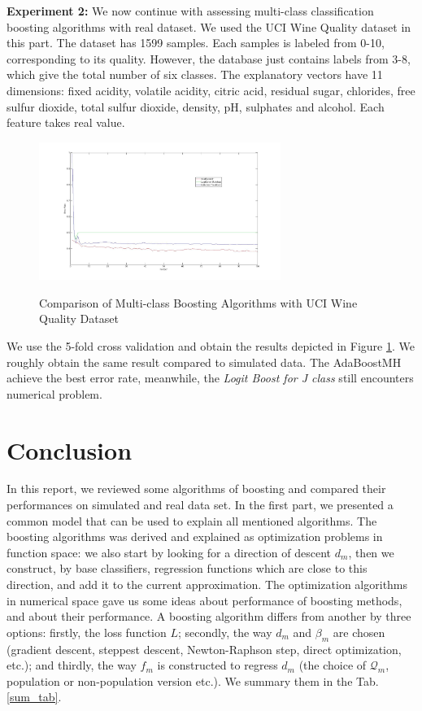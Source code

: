 \documentclass[a4paper,twoside,12pt]{article}
\begin{document}
\textbf{Experiment 2:} We now continue with assessing multi-class classification boosting algorithms with real dataset. We used the UCI Wine Quality dataset in this part. The dataset has 1599 samples. Each samples is labeled from 0-10, corresponding to its quality. However, the database just contains   labels from 3-8, which give the total number of six classes. The explanatory vectors have 11 dimensions: fixed acidity, volatile acidity, citric acid, residual sugar, chlorides, free sulfur dioxide, total sulfur dioxide, density, pH, sulphates and alcohol. Each feature takes real value.
\begin{figure}[H]
\centering
\caption{Comparison of Multi-class Boosting Algorithms with UCI Wine Quality Dataset}
\includegraphics[width = 0.7\textwidth]{Figures/wine_quality}
\label{fig:wine_quality}
\end{figure}
We use the 5-fold cross validation and obtain the results depicted in Figure \ref{fig:wine_quality}. We roughly obtain the same result compared to simulated data. The AdaBoostMH achieve the best error rate, meanwhile, the \textit{Logit Boost for J class} still encounters numerical problem.

\section{Conclusion}
In this report, we reviewed some algorithms of boosting and compared their performances on simulated and real data set. In the first part, we presented a common model that can be used to explain all mentioned algorithms. The boosting algorithms was derived and explained as optimization problems in function space: we also start by looking for a direction of descent $d_m$, then we construct, by base classifiers, regression functions which are close to this direction, and add it to the current approximation. The optimization algorithms in numerical space gave us some ideas about performance of boosting methods, and about their performance. A boosting algorithm differs from another by three options: firstly, the loss function $L$; secondly, the way $d_m$ and $\beta_m$ are chosen (gradient descent, steppest descent, Newton-Raphson step, direct optimization, etc.); and thirdly, the way $f_m$ is constructed to regress $d_m$ (the choice of $\mathcal{Q}_m$, population or non-population version etc.). We summary them in the Tab. \ref{sum_tab}.
\end{document}
